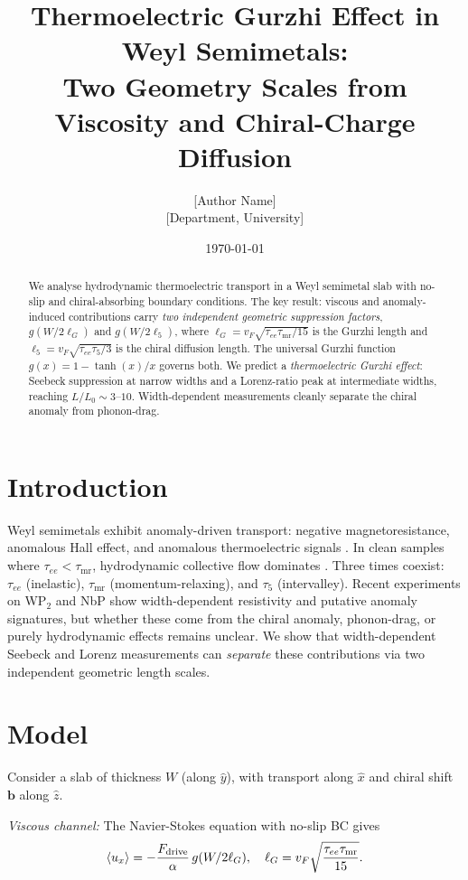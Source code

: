 \documentclass[twocolumn,11pt]{article}
\title{\textbf{Thermoelectric Gurzhi Effect in Weyl Semimetals:\\
Two Geometry Scales from Viscosity and Chiral-Charge Diffusion}}
\author{[Author Name]\\[0.1cm]
\small [Department, University]}
\date{\today}
\begin{document}
\maketitle

\begin{abstract}
We analyse hydrodynamic thermoelectric transport in a Weyl semimetal slab with 
no-slip and chiral-absorbing boundary conditions. The key result: viscous and 
anomaly-induced contributions carry \emph{two independent geometric suppression factors}, 
$g(W/2\ell_G)$ and $g(W/2\ell_5)$, where $\ell_G = v_F\sqrt{\tau_{ee}\tau_{\mathrm{mr}}/15}$ 
is the Gurzhi length and $\ell_5 = v_F\sqrt{\tau_{ee}\tau_5/3}$ is the chiral diffusion 
length. The universal Gurzhi function $g(x)=1-\tanh(x)/x$ governs both. We predict a 
\emph{thermoelectric Gurzhi effect}: Seebeck suppression at narrow widths and a 
Lorenz-ratio peak at intermediate widths, reaching $L/L_0 \sim 3$--$10$. 
Width-dependent measurements cleanly separate the chiral anomaly from phonon-drag.
\end{abstract}

\section{Introduction}

Weyl semimetals exhibit anomaly-driven transport: negative magnetoresistance, anomalous 
Hall effect, and anomalous thermoelectric signals \citep{Gooth2017,Gooth2018}. In clean samples where $\tau_{ee}<\tau_{\mathrm{mr}}$, 
hydrodynamic collective flow dominates \citep{Levitov2016,Bandurin2016,Crossno2016}. Three times coexist: $\tau_{ee}$ (inelastic), 
$\tau_{\mathrm{mr}}$ (momentum-relaxing), and $\tau_5$ (intervalley). Recent experiments 
on WP$_2$ and NbP \citep{Gooth2018} show width-dependent resistivity and putative anomaly signatures, 
but whether these come from the chiral anomaly, phonon-drag, or purely hydrodynamic 
effects remains unclear. We show that width-dependent Seebeck and Lorenz measurements 
can \emph{separate} these contributions via two independent geometric length scales.

\section{Model}

Consider a slab of thickness $W$ (along $\hat{y}$), with transport along $\hat{x}$ 
and chiral shift $\mathbf{b}$ along $\hat{z}$.

\textit{Viscous channel:} The Navier-Stokes equation with no-slip BC gives
\begin{equation}
\langle u_x \rangle = -\frac{F_{\rm drive}}{\alpha} \, g(W/2\ell_G), \quad 
\ell_G = v_F\sqrt{\frac{\tau_{ee}\tau_{\mathrm{mr}}}{15}}.
\end{equation}
\end{document}
